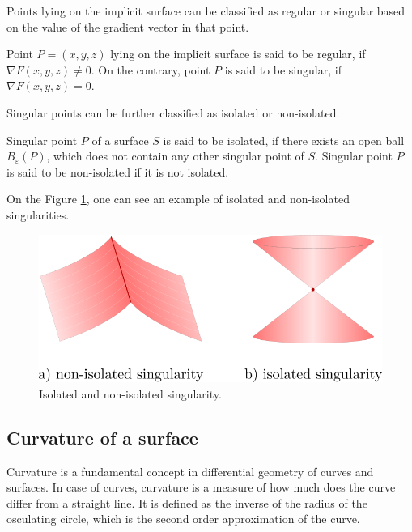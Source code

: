 Points lying on the implicit surface can be classified as regular or
singular based on the value of the gradient vector in that point.

\begin{definition}
    Point $P=(x,y,z)$ lying on the implicit surface is said to be regular,
    if $\nabla F(x, y, z) \neq 0$. On the contrary, point $P$ is said to be 
    singular, if $\nabla F(x, y, z) = 0$.
\end{definition}

Singular points can be further classified as isolated or non-isolated.

\begin{definition}
    Singular point $P$ of a surface $S$ is said to be isolated,
    if there exists an open ball $B_\varepsilon(P)$, which does not 
    contain any other singular point of $S$.
    Singular point $P$ is said to be non-isolated if it is not isolated.
\end{definition}

On the Figure \ref{img:2}, one can see an example of isolated and non-isolated
singularities.

\begin{figure}
    \centerline{\includegraphics[scale=0.5]{images/img2}}
    \caption[Isolated and non-isolated singularity]
    {Isolated and non-isolated singularity.}
    \label{img:2}
\end{figure}

\subsection*{Curvature of a surface}

Curvature is a fundamental concept in differential geometry of curves and surfaces.
In case of curves, curvature is a measure of how much does the curve differ from a 
straight line. It is defined as the inverse of the radius of the osculating circle,
which is the second order approximation of the curve.

